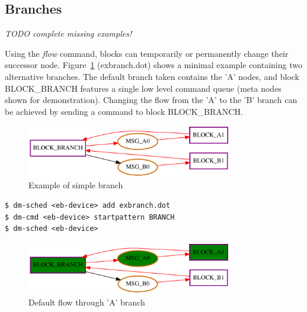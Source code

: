 \subsection{Branches}

\emph{TODO complete missing examples!}

Using the \emph{flow} command, blocks can temporarily or permanently change their successor node. Figure~\ref{fig:exbranch0} (exbranch.dot) shows a minimal example containing two alternative branches. The default branch taken contains the 'A' nodes, and block BLOCK\_BRANCH features a single low level command queue (meta nodes shown for demonstration). Changing the flow from the 'A' to the 'B' branch can be achieved by sending a command to block BLOCK\_BRANCH.

\begin{figure}[H]
   \centering
   \def\svgwidth{0.5\textwidth}
   \includegraphics*[width=0.8\textwidth,keepaspectratio]{Figures/exbranch0}
   \caption{ Example of simple branch }
   \label{fig:exbranch0}
\end{figure}

\begin{lstlisting}[style = customshell]
$ dm-sched <eb-device> add exbranch.dot
$ dm-cmd <eb-device> startpattern BRANCH
$ dm-sched <eb-device>
\end{lstlisting}

\begin{figure}[H]
   \centering
   \def\svgwidth{0.5\textwidth}
   \includegraphics*[width=0.8\textwidth,keepaspectratio]{Figures/exbranch1}
   \caption{ Default flow through 'A' branch }
   \label{fig:exbranch1}
\end{figure}



